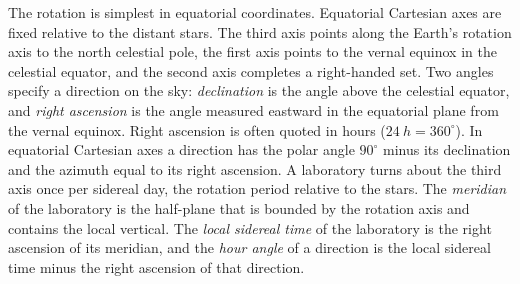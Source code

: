 The rotation is simplest in equatorial coordinates. Equatorial Cartesian axes are fixed relative to the distant stars. The third axis points along the Earth's rotation axis to the north celestial pole, the first axis points to the vernal equinox in the celestial equator, and the second axis completes a right-handed set. Two angles specify a direction on the sky: \emph{declination} is the angle above the celestial equator, and \emph{right ascension} is the angle measured eastward in the equatorial plane from the vernal equinox. Right ascension is often quoted in hours ($\SI{24}{h} = 360^\circ$). In equatorial Cartesian axes a direction has the polar angle $90^\circ$ minus its declination and the azimuth equal to its right ascension. A laboratory turns about the third axis once per sidereal day, the rotation period relative to the stars. The \emph{meridian} of the laboratory is the half-plane that is bounded by the rotation axis and contains the local vertical. The \emph{local sidereal time} of the laboratory is the right ascension of its meridian, and the \emph{hour angle} of a direction is the local sidereal time minus the right ascension of that direction.

